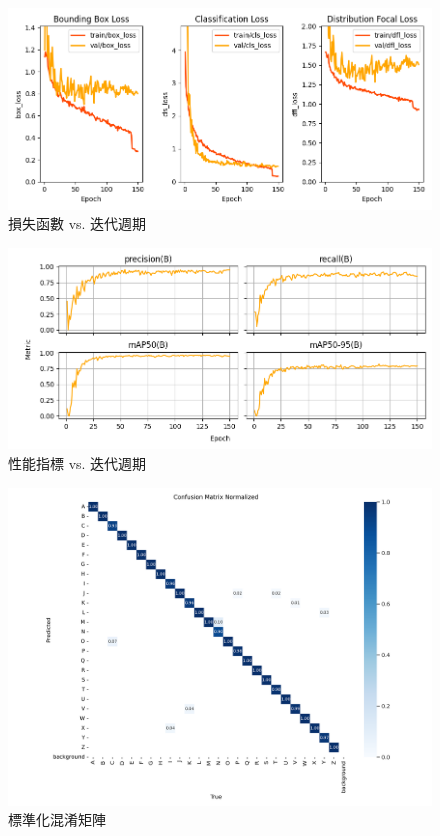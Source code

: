\documentclass[conference]{IEEEtran}
\begin{document}
\begin{figure}[htbp]
    \centering
    \includegraphics[width=\linewidth]{losses_epoch_detection_20240901.png}
    \caption{損失函數 vs. 迭代週期}
    \label{fig:loss-epoch}
\end{figure}

\begin{figure}[htbp]
    \centering
    \includegraphics[width=\linewidth]{metrics_epoch_detection_20240901.png}
    \caption{性能指標 vs. 迭代週期}
    \label{fig:metric-epoch}
\end{figure}

\begin{figure}[htbp]
    \centering
    \includegraphics[width=\linewidth]{confusion_matrix_normalized.png}
    \caption{標準化混淆矩陣}
    \label{fig:normalized-epoch}
\end{figure}
\end{document}
